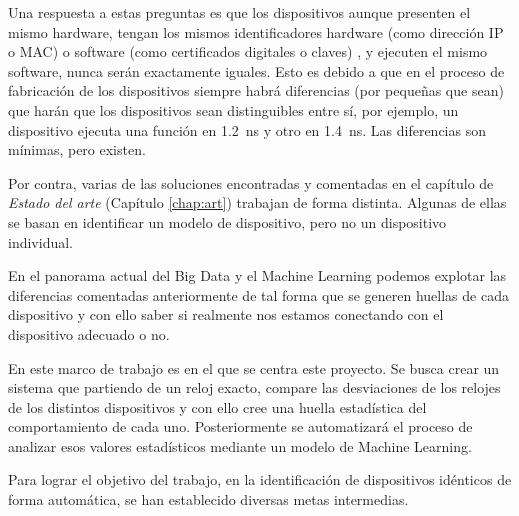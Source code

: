 Una respuesta a estas preguntas es que los dispositivos aunque presenten el mismo hardware, tengan los mismos identificadores hardware (como dirección IP o MAC) o software (como certificados digitales o claves) , y ejecuten el mismo software, nunca serán exactamente iguales. Esto es debido a que en el proceso de fabricación de los dispositivos siempre habrá diferencias (por pequeñas que sean) que harán que los dispositivos sean distinguibles entre sí, por ejemplo, un dispositivo ejecuta una función en \SI{1.2}{\nano\second} y otro en \SI{1.4}{\nano\second}. Las diferencias son mínimas, pero existen.

Por contra, varias de las soluciones encontradas y comentadas en el capítulo de \textit{Estado del arte} (Capítulo \ref{chap:art}) trabajan de forma distinta. Algunas de ellas se basan en identificar un modelo de dispositivo, pero no un dispositivo individual.

En el panorama actual del Big Data y el Machine Learning podemos explotar las diferencias comentadas anteriormente de tal forma que se generen huellas de cada dispositivo y con ello saber si realmente nos estamos conectando con el dispositivo adecuado o no.

En este marco de trabajo es en el que se centra este proyecto. Se busca crear un sistema que partiendo de un reloj exacto, compare las desviaciones de los relojes de los distintos dispositivos y con ello cree una huella estadística del comportamiento de cada uno. Posteriormente se automatizará el proceso de analizar esos valores estadísticos mediante un modelo de Machine Learning.

Para lograr el objetivo del trabajo, en la identificación de dispositivos idénticos de forma automática, se han establecido diversas metas intermedias.

